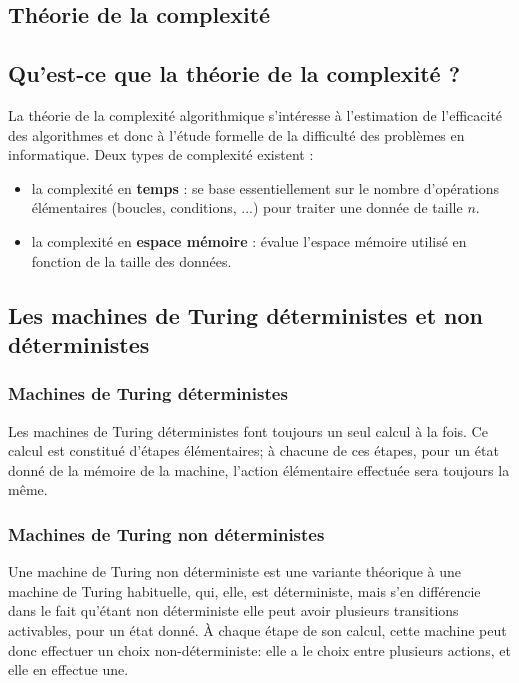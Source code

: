 \documentclass[runningheads,a4paper,10pt]{llncs}
\begin{document}
\newpage
\begin{subappendices}
\renewcommand{\thesection}{\Alph{section}}%

\section{Théorie de la complexité} \label{sec:complexity}

\subsection{Qu'est-ce que la théorie de la complexité ?}
La théorie de la complexité algorithmique s'intéresse à l'estimation de l'efficacité des
algorithmes et donc à l'étude formelle de la difficulté des problèmes en informatique. Deux types de complexité existent : 
\begin{itemize}
\item la complexité en \textbf{temps} : se base essentiellement sur le nombre d'opérations élémentaires (boucles, conditions, ...) pour traiter une donnée de taille $n$. 

\item la complexité en \textbf{espace mémoire} :  évalue l'espace mémoire utilisé en fonction de la taille des données.  
\end{itemize}

\subsection{Les machines de Turing déterministes et non déterministes}

\subsubsection{Machines de Turing déterministes} 
Les machines de Turing déterministes font toujours un seul calcul à la fois. Ce calcul est
constitué d'étapes élémentaires; à chacune de ces étapes, pour un état donné de la mémoire de la
machine, l'action élémentaire effectuée sera toujours la même.

\subsubsection{Machines de Turing non déterministes}
Une machine de Turing non déterministe est une variante théorique à une machine de Turing habituelle, qui, elle, est déterministe, mais s'en différencie dans le fait qu'étant non déterministe elle peut avoir plusieurs transitions activables, pour un état donné. À chaque étape de son calcul, cette machine peut donc effectuer un choix non-déterministe: elle a le choix entre plusieurs actions, et elle en effectue une. 


\end{subappendices}
\end{document}
